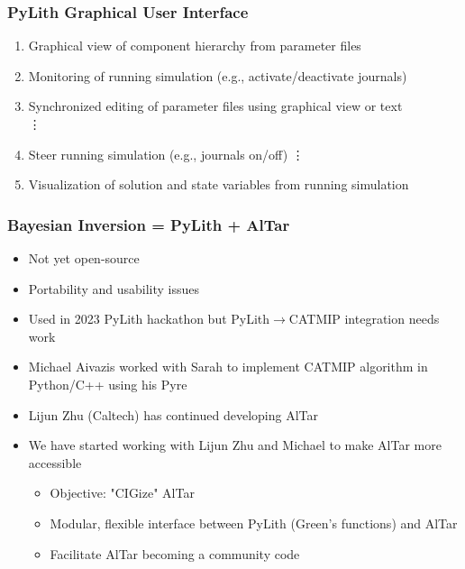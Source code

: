 \documentclass[aspectratio=169]{beamer}
\begin{document}
\begin{frame}
  \frametitle{PyLith Graphical User Interface}

  \begin{enumerate}
    \item Graphical view of component hierarchy from parameter files
    \item Monitoring of running simulation (e.g., activate/deactivate journals)
    \item Synchronized editing of parameter files using graphical view or text \\
    \noindent\vdots
    \item Steer running simulation (e.g., journals on/off)
    \noindent\vdots
    \item Visualization of solution and state variables from running simulation \\
  \end{enumerate}

\end{frame}


\begin{frame}[t]
  \frametitle{Bayesian Inversion = PyLith + AlTar}

  \begin{itemize}
      \begin{itemize}
      \item Not yet open-source
      \item Portability and usability issues
      \item Used in 2023 PyLith hackathon but PyLith$\rightarrow$CATMIP integration needs work
      \end{itemize}
      \begin{itemize}
      \item Michael Aivazis worked with Sarah to implement CATMIP algorithm in Python/C++ using his Pyre
      \item Lijun Zhu (Caltech) has continued developing AlTar
      \item We have started working with Lijun Zhu and Michael to make AlTar more accessible
        \begin{itemize}
        \item Objective: "CIGize" AlTar
        \item Modular, flexible interface between PyLith (Green's functions) and AlTar
        \item Facilitate AlTar becoming a community code
        \end{itemize}
      \end{itemize}
  \end{itemize}

\end{frame}
\end{document}
